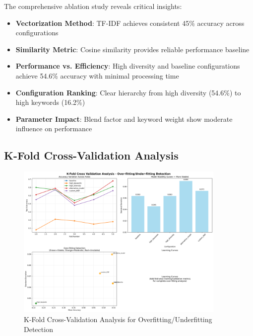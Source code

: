 \documentclass[12pt,a4paper]{article}
\begin{document}
The comprehensive ablation study reveals critical insights:
\begin{itemize}
    \item \textbf{Vectorization Method}: TF-IDF achieves consistent 45\% accuracy across configurations
    \item \textbf{Similarity Metric}: Cosine similarity provides reliable performance baseline
    \item \textbf{Performance vs. Efficiency}: High diversity and baseline configurations achieve 54.6\% accuracy with minimal processing time
    \item \textbf{Configuration Ranking}: Clear hierarchy from high diversity (54.6\%) to high keywords (16.2\%)
    \item \textbf{Parameter Impact}: Blend factor and keyword weight show moderate influence on performance
\end{itemize}

\subsection{K-Fold Cross-Validation Analysis}
\begin{figure}[H]
    \centering
    \includegraphics[width=0.9\textwidth]{data/visualizations/kfold_cross_validation_analysis.png}
    \caption{K-Fold Cross-Validation Analysis for Overfitting/Underfitting Detection}
    \label{fig:kfold_analysis}
\end{figure}
\end{document}
